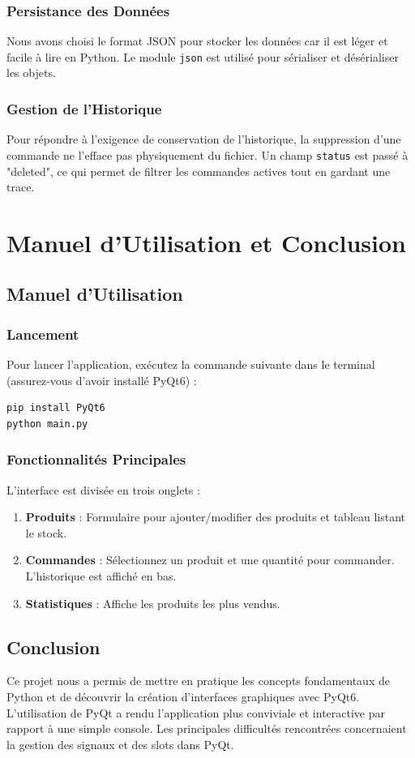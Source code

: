\documentclass[12pt,a4paper]{report}
\begin{document}
\subsection{Persistance des Données}
Nous avons choisi le format JSON pour stocker les données car il est léger et facile à lire en Python. Le module \texttt{json} est utilisé pour sérialiser et désérialiser les objets.

\subsection{Gestion de l'Historique}
Pour répondre à l'exigence de conservation de l'historique, la suppression d'une commande ne l'efface pas physiquement du fichier. Un champ \texttt{status} est passé à "deleted", ce qui permet de filtrer les commandes actives tout en gardant une trace.

\chapter{Manuel d'Utilisation et Conclusion}
\section{Manuel d'Utilisation}
\subsection{Lancement}
Pour lancer l'application, exécutez la commande suivante dans le terminal (assurez-vous d'avoir installé PyQt6) :
\begin{lstlisting}[language=bash]
pip install PyQt6
python main.py
\end{lstlisting}

\subsection{Fonctionnalités Principales}
L'interface est divisée en trois onglets :
\begin{enumerate}
    \item \textbf{Produits} : Formulaire pour ajouter/modifier des produits et tableau listant le stock.
    \item \textbf{Commandes} : Sélectionnez un produit et une quantité pour commander. L'historique est affiché en bas.
    \item \textbf{Statistiques} : Affiche les produits les plus vendus.
\end{enumerate}

\section{Conclusion}
Ce projet nous a permis de mettre en pratique les concepts fondamentaux de Python et de découvrir la création d'interfaces graphiques avec PyQt6.
L'utilisation de PyQt a rendu l'application plus conviviale et interactive par rapport à une simple console.
Les principales difficultés rencontrées concernaient la gestion des signaux et des slots dans PyQt.
\end{document}
